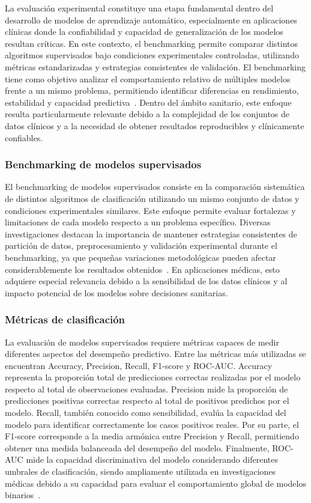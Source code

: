 La evaluación experimental constituye una etapa fundamental dentro del desarrollo de modelos de aprendizaje automático, especialmente en aplicaciones clínicas donde la confiabilidad y capacidad de generalización de los modelos resultan críticas. En este contexto, el benchmarking permite comparar distintos algoritmos supervisados bajo condiciones experimentales controladas, utilizando métricas estandarizadas y estrategias consistentes de validación.
El benchmarking tiene como objetivo analizar el comportamiento relativo de múltiples modelos frente a un mismo problema, permitiendo identificar diferencias en rendimiento, estabilidad y capacidad predictiva~\citep{delpino2025}. Dentro del ámbito sanitario, este enfoque resulta particularmente relevante debido a la complejidad de los conjuntos de datos clínicos y a la necesidad de obtener resultados reproducibles y clínicamente confiables.

\subsubsection{Benchmarking de modelos supervisados}

El benchmarking de modelos supervisados consiste en la comparación sistemática de distintos algoritmos de clasificación utilizando un mismo conjunto de datos y condiciones experimentales similares. Este enfoque permite evaluar fortalezas y limitaciones de cada modelo respecto a un problema específico.
Diversas investigaciones destacan la importancia de mantener estrategias consistentes de partición de datos, preprocesamiento y validación experimental durante el benchmarking, ya que pequeñas variaciones metodológicas pueden afectar considerablemente los resultados obtenidos~\citep{delpino2025,moassefi2023}. En aplicaciones médicas, esto adquiere especial relevancia debido a la sensibilidad de los datos clínicos y al impacto potencial de los modelos sobre decisiones sanitarias.

\subsubsection{Métricas de clasificación}\label{sec:metricas-clasificacion}

La evaluación de modelos supervisados requiere métricas capaces de medir diferentes aspectos del desempeño predictivo. Entre las métricas más utilizadas se encuentran Accuracy, Precision, Recall, F1-score y ROC-AUC.
Accuracy representa la proporción total de predicciones correctas realizadas por el modelo respecto al total de observaciones evaluadas. Precision mide la proporción de predicciones positivas correctas respecto al total de positivos predichos por el modelo.
Recall, también conocido como sensibilidad, evalúa la capacidad del modelo para identificar correctamente los casos positivos reales. Por su parte, el F1-score corresponde a la media armónica entre Precision y Recall, permitiendo obtener una medida balanceada del desempeño del modelo.
Finalmente, ROC-AUC mide la capacidad discriminativa del modelo considerando diferentes umbrales de clasificación, siendo ampliamente utilizada en investigaciones médicas debido a su capacidad para evaluar el comportamiento global de modelos binarios~\citep{owusuadjei2023}.

